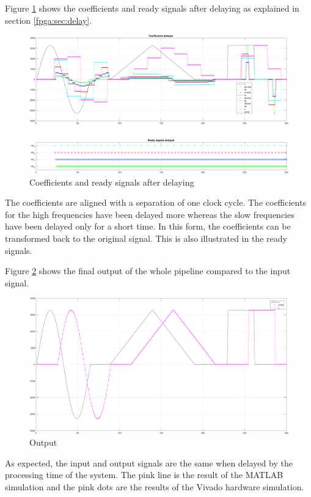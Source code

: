 \begin{refsection}
Figure \ref{fpga:fig:coeff_delayed} shows the coefficients and ready signals after delaying as explained in section \ref{fpga:sec:delay}.
\begin{figure}
	\centering
	\includegraphics[width=\textwidth]{papers/fpga/images/coefs_delayed_with_step.pdf}
	\caption{Coefficients and ready signals after delaying \label{fpga:fig:coeff_delayed}}
\end{figure}
The coefficients are aligned with a separation of one clock cycle. 
The coefficients for the high frequencies have been delayed more whereas the slow frequencies have been delayed only for a short time. 
In this form, the coefficients can be transformed back to the original signal. 
This is also illustrated in the ready signals.

Figure \ref{fpga:fig:output} shows the final output of the whole pipeline compared to the input signal. 
\begin{figure}
	\centering
	\includegraphics[width=\textwidth]{papers/fpga/images/output_with_step.pdf}
	\caption{Output \label{fpga:fig:output}}
\end{figure}
As expected, the input and output signals are the same when delayed by the processing time of the system.
The pink line is the result of the MATLAB simulation and the pink dots are the results of the Vivado hardware simulation. 


\end{refsection}
